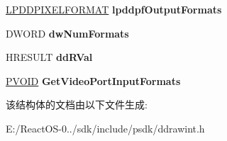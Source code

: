 \begin{DoxyCompactItemize}
\hyperlink{interfacevoid}{L\+P\+D\+D\+P\+I\+X\+E\+L\+F\+O\+R\+M\+AT} {\bfseries lpddpf\+Output\+Formats}
\item 
\mbox{\label{struct___d_d___g_e_t_v_p_o_r_t_o_u_t_p_u_t_f_o_r_m_a_t_d_a_t_a_ae31026b1e1c6e7e0a3fd0eccf6a20c2f}} 
D\+W\+O\+RD {\bfseries dw\+Num\+Formats}
\item 
\mbox{\label{struct___d_d___g_e_t_v_p_o_r_t_o_u_t_p_u_t_f_o_r_m_a_t_d_a_t_a_a062d5ced394e6233ccb053517e604db3}} 
H\+R\+E\+S\+U\+LT {\bfseries dd\+R\+Val}
\item 
\mbox{\label{struct___d_d___g_e_t_v_p_o_r_t_o_u_t_p_u_t_f_o_r_m_a_t_d_a_t_a_a4d08470b5bd205242e46e3bb6c8a8190}} 
\hyperlink{interfacevoid}{P\+V\+O\+ID} {\bfseries Get\+Video\+Port\+Input\+Formats}
\end{DoxyCompactItemize}


该结构体的文档由以下文件生成\+:\begin{DoxyCompactItemize}
\item 
E\+:/\+React\+O\+S-\/0../sdk/include/psdk/ddrawint.\+h\end{DoxyCompactItemize}
